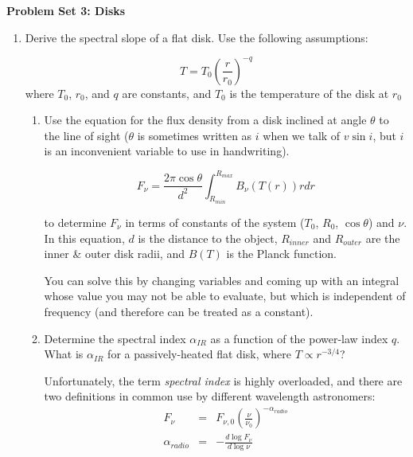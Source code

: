 \documentclass[twoside]{tufte-book} %
\begin{document}
\noindent\textbf{Problem Set 3: Disks}








\begin{enumerate}
\item
    Derive the spectral slope of a flat disk.  Use the following assumptions:

    \begin{equation}
        \label{eqn:tpower}
        T = T_0 \left(\frac{r}{r_0}\right)^{-q}
    \end{equation}
    where $T_0$, $r_0$, and $q$ are constants, and $T_0$ is the temperature of the disk at $r_0$

    \begin{enumerate}
        \item Use the equation for the flux density from a disk inclined at
            angle $\theta$ to the line of sight ($\theta$ is sometimes written
            as $i$ when we talk of $v \sin i$, but $i$ is an inconvenient
            variable to use in handwriting).

            \begin{equation}
                F_\nu = \frac{2 \pi \cos\theta}{d^2} \int_{R_{min}}^{R_{max}} B_\nu(T(r)) r dr
            \end{equation}

            to determine $F_\nu$ in terms of constants of the system ($T_0$,
            $R_0$, $\cos \theta$) and $\nu$.  In this equation, $d$ is the
            distance to the object, $R_{inner}$ and $R_{outer}$ are the inner
            \& outer disk radii, and $B(T)$ is the Planck function.  


            You can solve this by changing variables and coming up with an
            integral whose value you may not be able to evaluate, but which is
            independent of frequency (and therefore can be treated as a constant).

        \item Determine the spectral index $\alpha_{IR}$ as a function of the power-law index $q$.
            What is $\alpha_{IR}$ for a passively-heated flat disk, where $T\propto r^{-3/4}$?

            Unfortunately, the term \textit{spectral index} is highly overloaded, and there are two
            definitions in common use by different wavelength astronomers:
            \begin{eqnarray}
                F_\nu  & =&  F_{\nu,0} \left(\frac{\nu}{\nu_0}\right)^{-\alpha_{radio}} \\
                \alpha_{radio} & =&  - \frac{d \log {F_\nu}}{d \log \nu}  
            \end{eqnarray}


\end{enumerate}
\end{enumerate}
\end{document}
